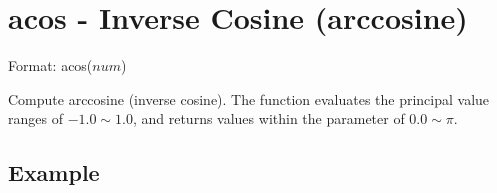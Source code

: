 
%

\section{acos - Inverse Cosine (arccosine)\label{sect:acos}}

Format: acos($num$)

Compute arccosine (inverse cosine). The function evaluates the principal value ranges of  $-1.0\sim 1.0$, and returns values within the parameter of $0.0\sim \pi$.


\subsection*{Example}


%


